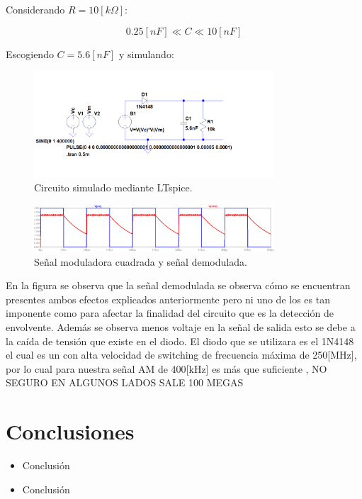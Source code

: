 \documentclass[letterpaper, titlepage]{article}
\begin{document}
\begin{enumerate}
Considerando $ R = 10[k \Omega] $:

\begin{equation}
0.25[nF]   \ll C \ll  10[nF]
\end{equation}

Escogiendo $ C = 5.6[nF] $ y simulando:

\begin{figure}[H]
  \centering
    \includegraphics[width=0.8\textwidth]{circuitosim}
  \caption{Circuito simulado mediante LTspice.}
  \label{fig:ejemplo}
\end{figure}

\begin{figure}[H]
  \centering
    \includegraphics[width=0.8\textwidth]{graficodemod}
  \caption{Señal moduladora cuadrada y señal demodulada.}
  \label{fig:ejemplo}
\end{figure}

En la figura se observa  que la señal demodulada  se observa cómo se encuentran presentes ambos efectos explicados anteriormente pero ni uno de los es tan imponente como para afectar la finalidad del circuito que es la detección de envolvente. Además se observa menos voltaje en la señal de salida esto se debe a la caída de tensión que existe en el diodo.
\newpage
El diodo que se utilizara es el 1N4148 el cual es un con alta velocidad de switching de frecuencia máxima de 250[MHz], por lo cual para nuestra señal AM de 400[kHz] es más que suficiente , NO SEGURO EN ALGUNOS LADOS SALE 100 MEGAS   
\end{enumerate}
\newpage



\section{Conclusiones}
	\begin{itemize}
		\item Conclusión
		\item Conclusión
	\end{itemize}
\end{document}
